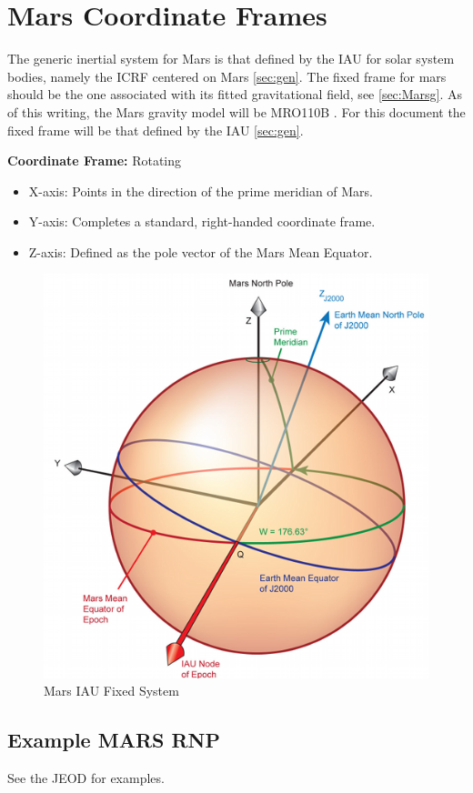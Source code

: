 
\section{Mars Coordinate Frames} \label{sec:Mars} 
The generic inertial system for Mars is that defined by the IAU for solar system bodies, namely the ICRF centered on Mars \ref{sec:gen}.
The fixed frame for mars should be the one associated with its fitted gravitational field, see \ref{sec:Marsg}. As of this writing, the Mars gravity model will be MRO110B \cite{2011Icar}. For this document the fixed frame will be that defined by the IAU \ref{sec:gen}.\

\textbf{Coordinate Frame: } Rotating 

\begin{itemize}
\item X-axis: Points in the direction of the prime meridian of Mars.
\item Y-axis: Completes a standard, right-handed coordinate frame.
\item Z-axis: Defined as the pole vector of the Mars Mean Equator.
\end{itemize}

\begin{figure}[htp]
\centering
\includegraphics [width=7in]{figs/fig7.png}
\caption{Mars IAU Fixed System}
\label{fig:7}
\end{figure}

\subsection{Example MARS RNP}
See the JEOD  for examples.
